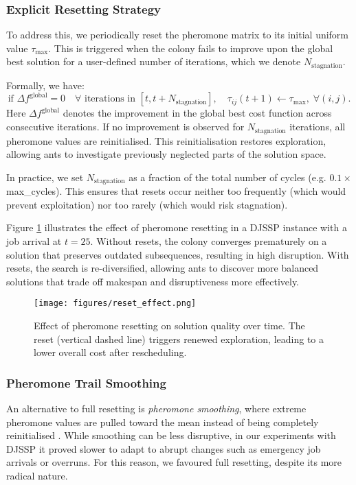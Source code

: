 \documentclass[final-report]{report-template}
\begin{document}
\subsubsection{Explicit Resetting Strategy}
To address this, we periodically reset the pheromone matrix to its initial uniform value $\tau_{\max}$. This is triggered when the colony fails to improve upon the global best solution for a user-defined number of iterations, which we denote $N_{\text{stagnation}}$. 

Formally, we have:
\[
\text{if } \Delta f^{\text{global}} = 0 \quad \forall \text{ iterations in } [t, t+N_{\text{stagnation}}], \quad \tau_{ij}(t+1) \gets \tau_{\max}, \; \forall (i,j).
\]
Here $\Delta f^{\text{global}}$ denotes the improvement in the global best cost function across consecutive iterations. If no improvement is observed for $N_{\text{stagnation}}$ iterations, all pheromone values are reinitialised. This reinitialisation restores exploration, allowing ants to investigate previously neglected parts of the solution space.


In practice, we set $N_{\text{stagnation}}$ as a fraction of the total number of cycles (e.g. $0.1 \times$ max\_cycles). This ensures that resets occur neither too frequently (which would prevent exploitation) nor too rarely (which would risk stagnation).

Figure \ref{fig:reset-comparison} illustrates the effect of pheromone resetting in a DJSSP instance with a job arrival at $t=25$. Without resets, the colony converges prematurely on a solution that preserves outdated subsequences, resulting in high disruption. With resets, the search is re-diversified, allowing ants to discover more balanced solutions that trade off makespan and disruptiveness more effectively.

\begin{figure}[H]
    \centering
    \texttt{[image: figures/reset\_effect.png]}
    \caption{Effect of pheromone resetting on solution quality over time. The reset (vertical dashed line) triggers renewed exploration, leading to a lower overall cost after rescheduling.}
    \label{fig:reset-comparison}
\end{figure}

\subsubsection{Pheromone Trail Smoothing}
An alternative to full resetting is \emph{pheromone smoothing}, where extreme pheromone values are pulled toward the mean instead of being completely reinitialised \cite{STUTZLE2000889}. While smoothing can be less disruptive, in our experiments with DJSSP it proved slower to adapt to abrupt changes such as emergency job arrivals or overruns. For this reason, we favoured full resetting, despite its more radical nature.
\end{document}

